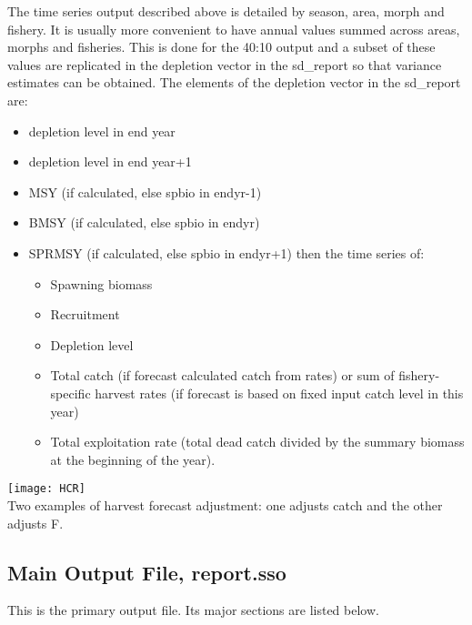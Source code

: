 The time series output described above is detailed by season, area, morph and fishery.  It is usually more convenient to have annual values summed across areas, morphs and fisheries.  This is done for the 40:10 output and a subset of these values are replicated in the depletion vector in the sd\_report so that variance estimates can be obtained.  The elements of the depletion vector in the sd\_report are:
\begin{itemize}
	\item depletion level in end year
	\item depletion level in end year+1
	\item MSY (if calculated, else spbio in endyr-1)
	\item BMSY (if calculated, else spbio in endyr)
	\item SPRMSY (if calculated, else spbio in endyr+1) then the time series of:
	\begin{itemize}
		\item Spawning biomass
		\item Recruitment
		\item Depletion level
		\item Total catch (if forecast calculated catch from rates) or sum of fishery-specific harvest rates (if forecast is based on fixed input catch level in this year)
		\item Total exploitation rate (total dead catch divided by the summary biomass at the beginning of the year).
	\end{itemize}
\end{itemize}

\begin{center}
	\texttt{[image: HCR]}\\
	Two examples of harvest forecast adjustment: one adjusts catch and the other adjusts F.
\end{center}

\subsection{Main Output File, report.sso}
This is the primary output file.  Its major sections are listed below.  

